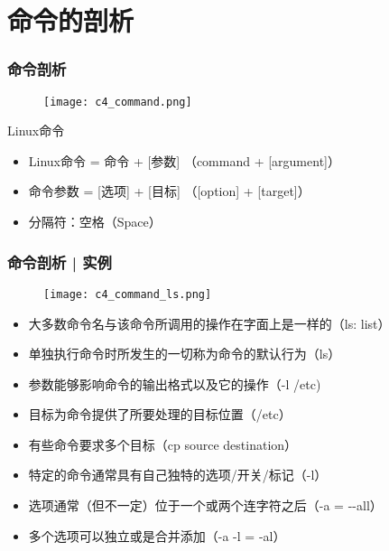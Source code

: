 \section{命令的剖析}
\begin{frame}
  \frametitle{\alert{命令剖析}}
  \begin{figure}
    \centering
    \texttt{[image: c4\_command.png]}
  \end{figure}
  \pause
  \begin{block}{Linux命令}
    \begin{itemize}[<+->]
      \item Linux命令 = 命令 + [参数] （command + [argument]）
      \item 命令参数 = [选项] + [目标] （[option] + [target]）
      \item 分隔符：空格（Space）
    \end{itemize}
  \end{block}
\end{frame}

\begin{frame}
  \frametitle{命令剖析 | 实例}
  \begin{figure}
    \centering
    \texttt{[image: c4\_command\_ls.png]}
  \end{figure}
  \pause
  \begin{itemize}[<+->]
    \item 大多数命令名与该命令所调用的操作在字面上是一样的（ls: list）
    \item 单独执行命令时所发生的一切称为命令的默认行为（ls）
    \item 参数能够影响命令的输出格式以及它的操作（-l /etc)
    \item 目标为命令提供了所要处理的目标位置（/etc）
    \item 有些命令要求多个目标（cp source destination）
    \item 特定的命令通常具有自己独特的选项/开关/标记（-l）
    \item 选项通常（但不一定）位于一个或两个连字符之后（-a = -\!-all）
    \item 多个选项可以独立或是合并添加（-a -l = -al）
  \end{itemize}
\end{frame}


